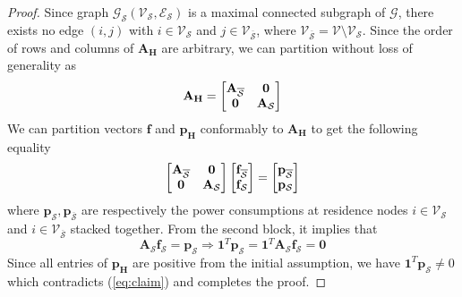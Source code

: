 \documentclass[sigconf]{acmart}
\begin{document}
\begin{proof}
	Since graph $\mathcal{G}_{\mathcal{S}}(\mathcal{V}_{\mathcal{S}},\mathcal{E}_{\mathcal{S}})$ is a maximal connected subgraph of $\mathcal{G}$, there exists no edge $(i,j)$ with $i\in\mathcal{V}_\mathcal{S}$ and $j\in\mathcal{V}_{\overline{\mathcal{S}}}$, where $\mathcal{V}_{\overline{\mathcal{S}}}=\mathcal{V}\setminus\mathcal{V}_{\mathcal{S}}$. Since the order of rows and columns of $\mathbf{A_H}$ are arbitrary, we can partition without loss of generality as
	\begin{equation}
		\mathbf{A_H}=\begin{bmatrix}\mathbf{A}_{\overline{\mathcal{S}}}&\mathbf{0}\\\mathbf{0}&\mathbf{A}_{\mathcal{S}}\end{bmatrix}\notag
	\end{equation}
	We can partition vectors $\mathbf{f}$ and $\mathbf{p_H}$ conformably to $\mathbf{A_H}$ to get the following equality
	\begin{equation}
		\begin{bmatrix}\mathbf{A}_{\overline{\mathcal{S}}}&\mathbf{0}\\\mathbf{0}&\mathbf{A}_{\mathcal{S}}\end{bmatrix}\begin{bmatrix}\mathbf{f}_{\overline{\mathcal{S}}}\\\mathbf{f}_{\mathcal{S}}\end{bmatrix}=\begin{bmatrix}\mathbf{p}_{{\overline{\mathcal{S}}}}\\\mathbf{p}_{\mathcal{S}}\end{bmatrix}\notag
	\end{equation}
	where $\mathbf{p}_{\mathcal{S}},\mathbf{p}_{{\overline{\mathcal{S}}}}$ are respectively the power consumptions at residence nodes $i\in\mathcal{V}_\mathcal{S}$ and  $i\in\mathcal{V}_{\overline{\mathcal{S}}}$ stacked together. From the second block, it implies that 
	\begin{equation}
		\mathbf{A}_{\mathcal{S}}\mathbf{f}_{\mathcal{S}}=\mathbf{p}_{\mathcal{S}}\Rightarrow \mathbf{1}^T\mathbf{p}_{\mathcal{S}}=\mathbf{1}^T\mathbf{A}_{\mathcal{S}}\mathbf{f}_{\mathcal{S}}=\mathbf{0}\label{eq:claim}
	\end{equation}
	Since all entries of $\mathbf{p_H}$ are positive from the initial assumption, we have $\mathbf{1}^T\mathbf{p}_{\mathcal{S}}\neq0$ which contradicts (\ref{eq:claim}) and completes the proof. 
\end{proof}
\end{document}
